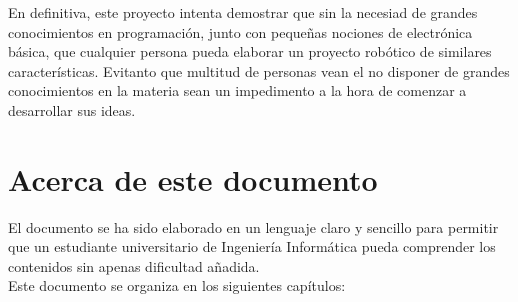 En definitiva, este proyecto intenta demostrar que sin la necesiad de grandes conocimientos en programación, junto con pequeñas nociones de electrónica básica, que cualquier
persona pueda elaborar un proyecto robótico de similares características. Evitanto que multitud de personas vean el no disponer de grandes conocimientos en la materia sean un impedimento a la 
hora de comenzar a desarrollar sus ideas.\\


\section{Acerca de este documento}

El documento se ha sido elaborado en un lenguaje claro y sencillo para permitir que un estudiante universitario de Ingeniería Informática pueda comprender los contenidos sin apenas dificultad añadida.\\

Este documento se organiza en los siguientes capítulos:\\

